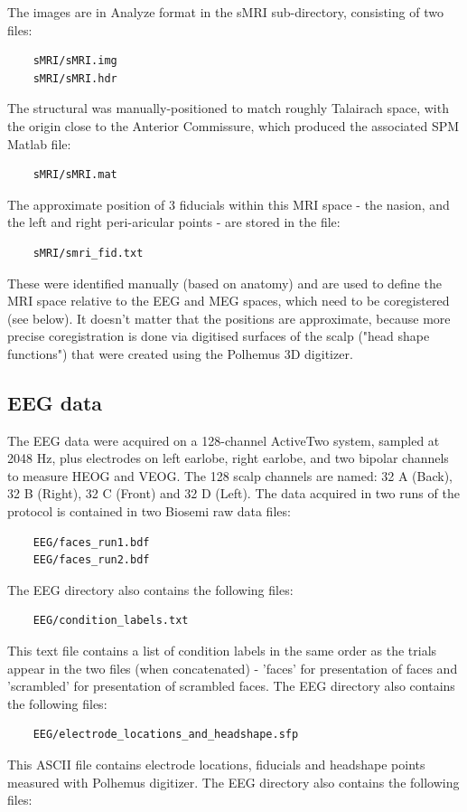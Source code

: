 The images are in Analyze format in the sMRI sub-directory, consisting of two files:
\begin{verbatim}
    sMRI/sMRI.img
    sMRI/sMRI.hdr
\end{verbatim}
The structural was manually-positioned to match roughly Talairach space, with the origin close to the Anterior Commissure, which produced the associated SPM Matlab file:
\begin{verbatim}
    sMRI/sMRI.mat
\end{verbatim}
The approximate position of 3 fiducials within this MRI space - the nasion, and the left and right peri-aricular points - are stored in the file:
\begin{verbatim}
    sMRI/smri_fid.txt
\end{verbatim}
These were identified manually (based on anatomy) and are used to define the MRI space relative to the EEG and MEG spaces, which need to be coregistered (see below). It doesn't matter that the positions are approximate, because more precise coregistration is done via digitised surfaces of the scalp ("head shape functions") that were created using the Polhemus 3D digitizer.

\subsection{EEG data}

The EEG data were acquired on a 128-channel ActiveTwo system, sampled at 2048 Hz, plus electrodes on left earlobe, right earlobe, and two bipolar channels to measure HEOG and VEOG. The 128 scalp channels are named: 32 A (Back), 32 B (Right), 32 C (Front) and 32 D (Left). The data acquired in two runs of the protocol is contained in two Biosemi raw data files:
\begin{verbatim}
    EEG/faces_run1.bdf
    EEG/faces_run2.bdf
\end{verbatim}

The EEG directory also contains the following files:
\begin{verbatim}
    EEG/condition_labels.txt
\end{verbatim}
This text file contains a list of condition labels in the same order as the trials appear in the two files (when concatenated) - 'faces' for presentation of faces and 'scrambled' for presentation of scrambled faces. 
The EEG directory also contains the following files:
\begin{verbatim}
    EEG/electrode_locations_and_headshape.sfp
\end{verbatim}
This ASCII file contains electrode locations, fiducials and headshape points measured with Polhemus digitizer.
The EEG directory also contains the following files:


